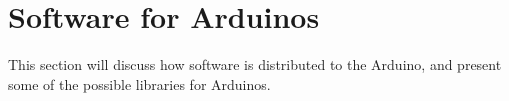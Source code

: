 \section{Software for Arduinos}\label{sec:software}
This section will discuss how software is distributed to the Arduino, and present some of the possible libraries for Arduinos.

